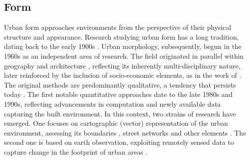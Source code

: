 \subsection{Form}
\label{sec:lit_form}

Urban form approaches environments from the perspective of their physical
structure and appearance. Research studying urban form has a long tradition,
dating back to the early 1900s \citep{geddes1915cities,
trewartha1934japanese}. Urban morphology, subsequently, begun in the 1960s as an
independent area of research. The field originated in parallel within geography
\citep{conzen1960alnwick} and architecture \citep{muratori1959studi}, reflecting
its inherently multi-disciplinary nature, later reinforced by the inclusion of
socio-economic elements, as in the work of \cite{panerai1997formes}. The
original methods are predominantly qualitative, a tendency that persists today
\citep{dibble2016urban}. The first notable quantitative approaches date to the
late 1980s and 1990s, reflecting advancements in computation and newly available
data capturing the built environment. In this context, two strains of research
have emerged. One focuses on cartographic (vector) representation of the urban
environment, assessing its boundaries \citep{batty1987}, street networks
\citep{hillier1996, porta2006} and other elements \citep{pivo1993taxonomy}. The
second one is based on earth observation, exploiting remotely sensed data to
capture change in the footprint of urban areas \citep{howarth1983landsat}.

